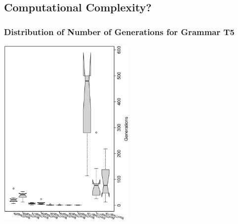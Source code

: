 \documentclass[18pt,c]{beamer}
\begin{document}
\subsection{Computational Complexity?}
 \begin{frame}
 \frametitle{ Distribution of Number of Generations for Grammar T5 }
 \begin{center}
\includegraphics[width=0.5\textwidth, angle=-90]
{ExpFboxplottGenerations011.eps}
 \end{center}
 \label{ExpFboxplottGenerations011.eps}  
 \end{frame}
\end{document}
